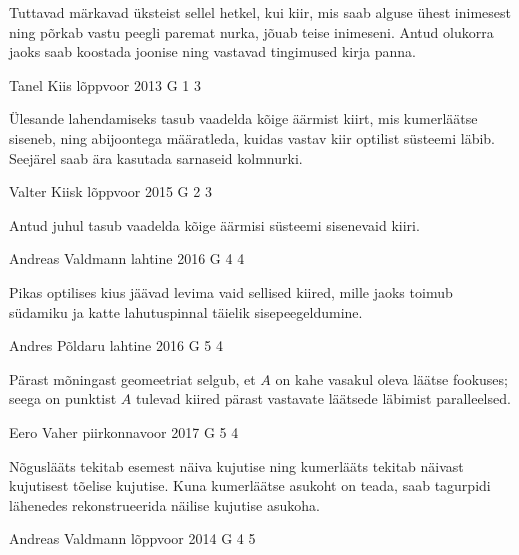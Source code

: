 \documentclass[11pt]{article}
\begin{document}
{{\ifHint
Tuttavad märkavad üksteist sellel hetkel, kui kiir, mis saab alguse ühest inimesest ning põrkab vastu peegli paremat nurka, jõuab teise inimeseni. Antud olukorra jaoks saab koostada joonise ning vastavad tingimused kirja panna.
\fi
}

{Tanel Kiis} %
{lõppvoor} %
{2013} %
{G 1} %
{3} %
{

\ifHint
Ülesande lahendamiseks tasub vaadelda kõige äärmist kiirt, mis kumerläätse siseneb, ning abijoontega määratleda, kuidas vastav kiir optilist süsteemi läbib. Seejärel saab ära kasutada sarnaseid kolmnurki.
\fi
}

{Valter Kiisk} %
{lõppvoor} %
{2015} %
{G 2} %
{3} %
{

\ifHint
Antud juhul tasub vaadelda kõige äärmisi süsteemi sisenevaid kiiri.
\fi
}

{Andreas Valdmann} %
{lahtine} %
{2016} %
{G 4} %
{4} %
{

\ifHint
Pikas optilises kius jäävad levima vaid sellised kiired, mille jaoks toimub südamiku ja katte lahutuspinnal täielik sisepeegeldumine.
\fi
}

{Andres Põldaru} %
{lahtine} %
{2016} %
{G 5} %
{4} %
{

\ifHint
Pärast mõningast geomeetriat selgub, et $A$ on kahe vasakul oleva läätse fookuses; seega on punktist $A$ tulevad kiired pärast vastavate läätsede läbimist paralleelsed.
\fi
}

{Eero Vaher} %
{piirkonnavoor} %
{2017} %
{G 5} %
{4} %
{

\ifHint
Nõguslääts tekitab esemest näiva kujutise ning kumerlääts tekitab näivast kujutisest tõelise kujutise. Kuna kumerläätse asukoht on teada, saab tagurpidi lähenedes rekonstrueerida näilise kujutise asukoha.
\fi
}

{Andreas Valdmann} %
{lõppvoor} %
{2014} %
{G 4} %
{5} %
{

}}
\end{document}
